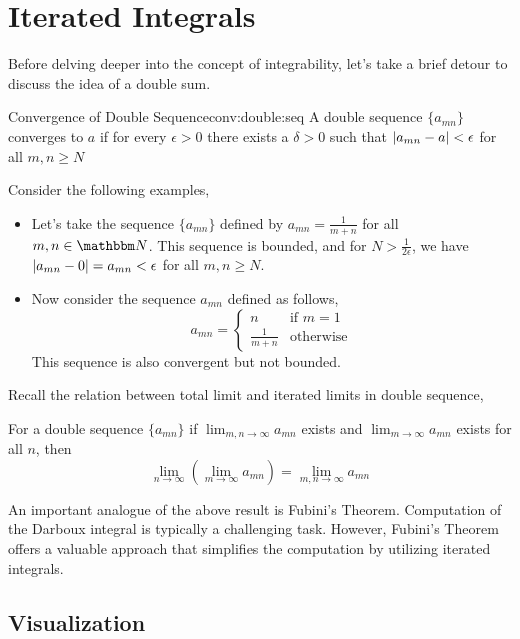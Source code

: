 \documentclass[../Analysis-3.tex]{subfiles}
\begin{document}
\section{Iterated Integrals}

Before delving deeper into the concept of integrability, let's take a brief detour to discuss the idea of a double sum.

\begin{Def}{Convergence of Double Sequence}{conv:double:seq}
  A double sequence $ \{a_{mn}\} $ converges to $ a $ if for every $ \epsilon > 0 $ there exists a $ \delta > 0 $ such that $ \abs{a_{mn} - a} < \epsilon $ for all $ m,n \geq N $
\end{Def}

Consider the following examples,
\begin{Eg}{}{}
  \begin{itemize}
    \item Let's take the sequence $ \{a_{mn}\} $ defined by $ a_{mn} = \frac 1{m+n} $ for all $ m,n \in \N $. This sequence is bounded, and for $ N > \frac 1{2\epsilon} $, we have $ \abs{a_{mn} - 0} = a_{mn} < \epsilon $ for all $ m,n \geq N $.
    \item Now consider the sequence $ {a_{mn}} $ defined as follows,
          \[  a_{mn} = \begin{cases}
              n            & \text{if } m=1   \\
              \frac 1{m+n} & \text{otherwise}
            \end{cases}  \]
          This sequence is also convergent but not bounded.
  \end{itemize}
\end{Eg}

Recall the relation between total limit and iterated limits in double sequence,
\begin{ThmN}{}{}
  For a double sequence $ \{a_{mn}\} $ if $ \lim_{m,n \to \infty} a_{mn} $ exists and $ \lim_{m \to \infty} a_{mn} $ exists for all $ n $, then
  \[  \lim_{n \to \infty}\left( \lim_{m \to \infty} a_{mn} \right) = \lim_{m,n \to \infty} a_{mn}  \]
\end{ThmN}
An important analogue of the above result is Fubini's Theorem. Computation of the Darboux integral is typically a challenging task. However, Fubini's Theorem offers a valuable approach that simplifies the computation by utilizing iterated integrals.

\subsection*{Visualization}
\end{document}
